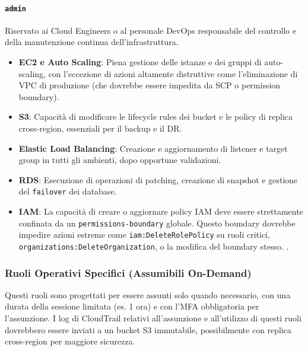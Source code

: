 \paragraph{\texttt{admin}}%
Riservato ai Cloud Engineers o al personale DevOps responsabile del controllo e della manutenzione continua dell'infrastruttura.  
\begin{itemize}
  \item \textbf{EC2 e Auto Scaling}: Piena gestione delle istanze e dei gruppi di auto-scaling, con l'eccezione di azioni altamente distruttive come l'eliminazione di VPC di produzione (che dovrebbe essere impedita da SCP o permission boundary).  
  \item \textbf{S3}: Capacità di modificare le lifecycle rules dei bucket e le policy di replica cross-region, essenziali per il backup e il DR.  
  \item \textbf{Elastic Load Balancing}: Creazione e aggiornamento di listener e target group in tutti gli ambienti, dopo opportune validazioni.  
  \item \textbf{RDS}: Esecuzione di operazioni di patching, creazione di snapshot e gestione del \texttt{failover} dei database.  
  \item \textbf{IAM}: La capacità di creare o aggiornare policy IAM deve essere strettamente confinata da un \texttt{permissions-boundary} globale. Questo boundary dovrebbe impedire azioni estreme come \texttt{iam:DeleteRolePolicy} su ruoli critici, \texttt{organizations:DeleteOrganization}, o la modifica del boundary stesso. \cite{AWSPermBoundaries}.
\end{itemize}

\subsubsection{Ruoli Operativi Specifici (Assumibili On-Demand)}
\label{subsubsec:ruoli_specifici_iam}
Questi ruoli sono progettati per essere assunti solo quando necessario, con una durata della sessione limitata (es. 1 ora) e con l'MFA obbligatoria per l'assunzione. I log di CloudTrail relativi all'assunzione e all'utilizzo di questi ruoli dovrebbero essere inviati a un bucket S3 immutabile, possibilmente con replica cross-region per maggiore sicurezza.

